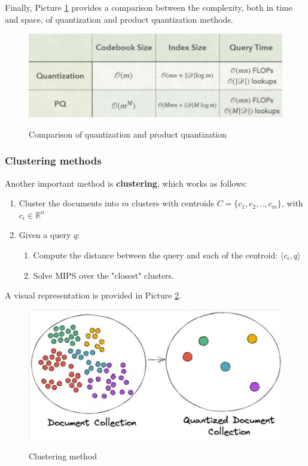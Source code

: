 Finally, Picture \ref{quantization4} provides a comparison between the complexity, both in time and space, of quantization and product quantization methods.

\begin{figure}[h!]
		\centering
		\includegraphics[scale = 2.0]{img/quantization_3.jpg}
        \label{quantization4}
        \caption{Comparison of quantization and product quantization}
\end{figure}

\subsubsection{Clustering methods}
Another important method is \textbf{clustering}, which works as follows:

\begin{enumerate}
    \item Cluster the documents into $m$ clusters with centroids $C = \{ c_1, c_2, .., c_m  \}$, with $c_i \in \mathbb{R}^n$
    \item Given a query $q$:
    \begin{enumerate}
        \item Compute the distance between the query and each of the centroid: $\langle c_i, q \rangle$
        \item Solve MIPS over the "closest" clusters.
    \end{enumerate}
\end{enumerate}

A visual representation is provided in Picture \ref{clustering}.

\begin{figure}[h!]
		\centering
		\includegraphics[scale = 2.0]{img/clustering.jpg}
        \label{clustering}
        \caption{Clustering method}
\end{figure}

